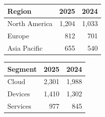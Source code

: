 \documentclass{article}\pagestyle{empty}
\begin{document}
\noindent\begin{tabular}{p{5cm}rr}\hline
Region & 2025 & 2024 \\ \hline
North America & 1,204 & 1,033 \\ \hline
Europe & 812 & 701 \\ \hline
Asia Pacific & 655 & 540 \\ \hline
\end{tabular}

\vspace{30pt}\noindent\begin{tabular}{p{5cm}rr}
Segment & 2025 & 2024 \\ \hline
Cloud & 2,301 & 1,988 \\ \hline
Devices & 1,410 & 1,302 \\ \hline
Services & 977 & 845 \\ \hline
\end{tabular}
\end{document}
